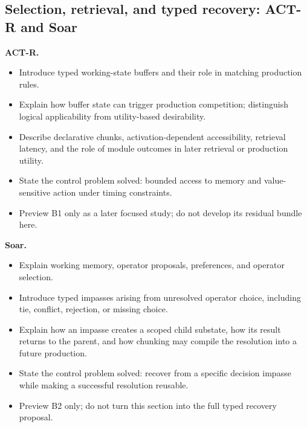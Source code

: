\subsection{Selection, retrieval, and typed recovery: ACT-R and Soar}
\textbf{ACT-R.}
\begin{itemize}
  \item Introduce typed working-state buffers and their role in matching production rules.
  \item Explain how buffer state can trigger production competition; distinguish logical applicability from utility-based desirability.
  \item Describe declarative chunks, activation-dependent accessibility, retrieval latency, and the role of module outcomes in later retrieval or production utility.
  \item State the control problem solved: bounded access to memory and value-sensitive action under timing constraints.
  \item Preview B1 only as a later focused study; do not develop its residual bundle here.
\end{itemize}
\textbf{Soar.}
\begin{itemize}
  \item Explain working memory, operator proposals, preferences, and operator selection.
  \item Introduce typed impasses arising from unresolved operator choice, including tie, conflict, rejection, or missing choice.
  \item Explain how an impasse creates a scoped child substate, how its result returns to the parent, and how chunking may compile the resolution into a future production.
  \item State the control problem solved: recover from a specific decision impasse while making a successful resolution reusable.
  \item Preview B2 only; do not turn this section into the full typed recovery proposal.
\end{itemize}


